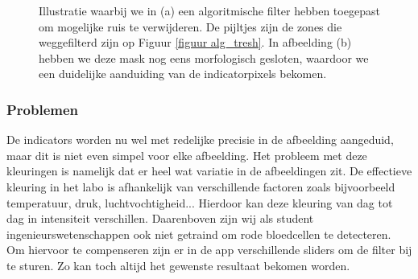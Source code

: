 \documentclass[a4paper,kulak]{kulakarticle}
\begin{document}
\begin{figure}[H]
	\centering
	\qquad
	
	\caption{Illustratie waarbij we in (a) een algoritmische filter hebben toegepast om mogelijke ruis te verwijderen. De pijltjes zijn de zones die weggefilterd zijn op Figuur \ref{figuur alg_tresh}. In afbeelding (b) hebben we deze mask nog eens morfologisch gesloten, waardoor we een duidelijke aanduiding van de indicatorpixels bekomen.}
	\label{figuur morf}
\end{figure}

\subsubsection{Problemen}
De indicators worden nu wel met redelijke precisie in de afbeelding aangeduid, maar dit is niet even simpel voor elke afbeelding.
Het probleem met deze kleuringen is namelijk dat er heel wat variatie in de afbeeldingen zit. De effectieve kleuring in het labo is afhankelijk van verschillende factoren zoals bijvoorbeeld temperatuur, druk, luchtvochtigheid... Hierdoor kan deze kleuring van dag tot dag in intensiteit verschillen. Daarenboven zijn wij als student ingenieurswetenschappen ook niet getraind om rode bloedcellen te detecteren. Om hiervoor te compenseren zijn er in de app verschillende sliders om de filter bij te sturen. Zo kan toch altijd het gewenste resultaat bekomen worden.
\end{document}
